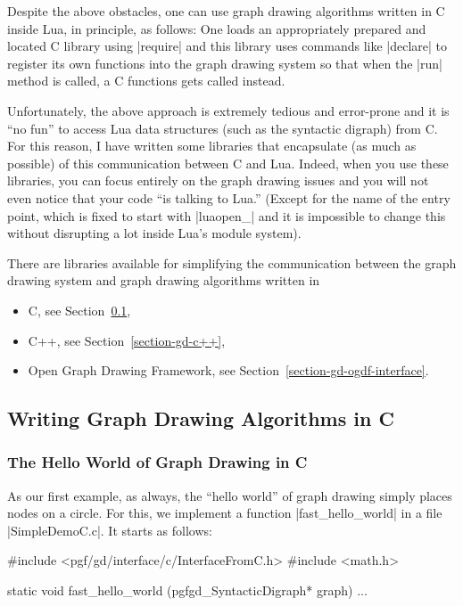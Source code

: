 Despite the above obstacles, one can use graph drawing algorithms
written in C inside Lua, in principle, as follows: One loads an
appropriately prepared and located C library using |require| and this
library uses commands like |declare| to register its own functions
into the graph drawing system so that when the |run| method is called,
a C functions gets called instead.

Unfortunately, the above approach is extremely tedious and error-prone
and it is ``no fun'' to access Lua data structures (such as the
syntactic digraph) from C. For this reason, I have written some
libraries that encapsulate (as much as possible) of this communication
between C and Lua. Indeed, when you use these libraries, you can focus
entirely on the graph drawing issues and you will not even notice that
your code ``is talking to Lua.'' (Except for the name of the entry
point, which is fixed to start with |luaopen_| and it is impossible to
change this without disrupting a lot inside Lua's module system).

There are libraries available for simplifying the communication
between the graph drawing system and graph drawing algorithms written
in

\begin{itemize}
\item C, see Section~\ref{section-gd-c},
\item C++, see Section~\ref{section-gd-c++},
\item Open Graph Drawing Framework, see Section~\ref{section-gd-ogdf-interface}.
\end{itemize}



\subsection{Writing Graph Drawing Algorithms in C}

\label{section-gd-c}

\subsubsection{The Hello World of Graph Drawing in C}

As our first example, as always, the ``hello world'' of graph drawing
simply places nodes on a circle. For this, we implement a
function |fast_hello_world| in a file |SimpleDemoC.c|. It starts as
follows:

\begin{codeexample}
#include <pgf/gd/interface/c/InterfaceFromC.h>
#include <math.h>

static void fast_hello_world (pgfgd_SyntacticDigraph* graph) {
  ...
}
\end{codeexample}

